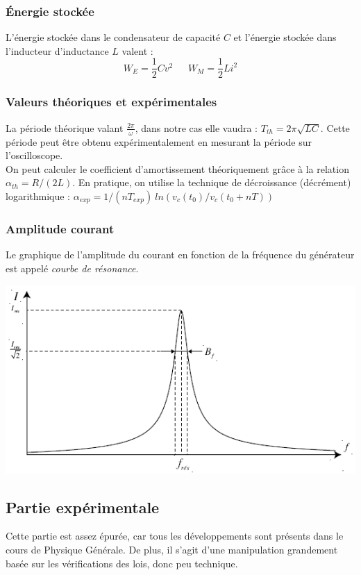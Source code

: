 \documentclass	[11pt, a4paper, openany]{book}
\begin{document}
\subsubsection*{Énergie stockée}
L'énergie stockée dans le condensateur de capacité $C$ et l'énergie stockée dans l'inducteur d'inductance $L$ valent : 
\begin{equation}
W_E = \frac{1}{2}Cv^2\ \ \ \ \ \ \ W_M = \frac{1}{2}Li^2
\end{equation}

\subsubsection*{Valeurs théoriques et expérimentales}
La période théorique valant $\frac{2\pi}{\omega}$, dans notre cas elle vaudra : $T_{th} = 2\pi\sqrt{LC}$. Cette période peut être obtenu expérimentalement en mesurant la période sur l'oscilloscope.\\

On peut calculer le coefficient d'amortissement théoriquement grâce à la relation $\alpha_{th} = R/(2L)$. En pratique, on utilise la technique de décroissance (décrément) logarithmique : $\alpha_{exp} = 1/(nT_{exp})\ ln(v_c(t_0) / v_c(t_0 + nT))$

\subsubsection*{Amplitude courant}
Le graphique de l'amplitude du courant en fonction de la fréquence du générateur est appelé \textit{courbe de résonance}.
\begin{center}
\includegraphics[scale=0.5]{labo/image31.png}
\end{center}


\newpage
\subsection{Partie expérimentale}
Cette partie est assez épurée, car tous les développements sont présents dans le cours de Physique Générale. De plus, il s'agit d'une manipulation grandement basée sur les vérifications des lois, donc peu technique.\\
\end{document}

